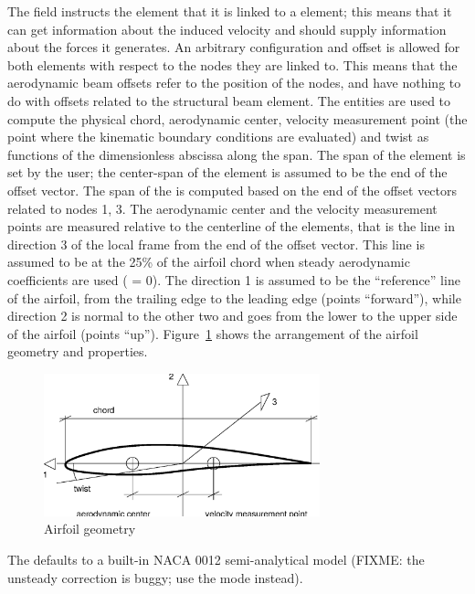 The field  instructs the element that it is linked to a 
 element; this means that it can get information about the
induced velocity and should supply information about the forces it generates.
An arbitrary configuration and offset is allowed for both elements with
respect to the nodes they are linked to. 
This means that the aerodynamic beam offsets refer to the position of the nodes,
and have nothing to do with offsets related to the structural beam element.
The  entities are used to compute the physical chord,
aerodynamic center, velocity measurement point (the point where the
kinematic boundary conditions are evaluated) and twist as functions 
of the dimensionless abscissa along the span.
The span of the  element is set by the user; the
center-span of the element is assumed to be the end of the offset vector.
The span of the  is computed based on the end of the
offset vectors related to nodes 1, 3.
The aerodynamic center and the velocity measurement points are measured
relative to the centerline of the elements, that is the line in direction 3
of the local frame from the end of the offset vector.
This line is assumed to be at the 25\% of the airfoil chord when steady
aerodynamic coefficients are used ( = 0).
The direction 1 is assumed to be the ``reference'' line of the airfoil, 
from the trailing edge to the leading edge (points ``forward''),
while direction 2 is normal to the other two and goes from the lower 
to the upper side of the airfoil (points ``up''). 
Figure~\ref{fig:AIRFOIL} shows the arrangement of the airfoil geometry 
and properties.

\begin{figure}[h]
  \centering
    \includegraphics[width=80mm]{airfoil.eps}
  \caption{Airfoil geometry}\label{fig:AIRFOIL}
\end{figure}

The  defaults to a built-in NACA 0012 semi-analytical
model (FIXME: the unsteady correction is buggy; use the  
mode instead).

